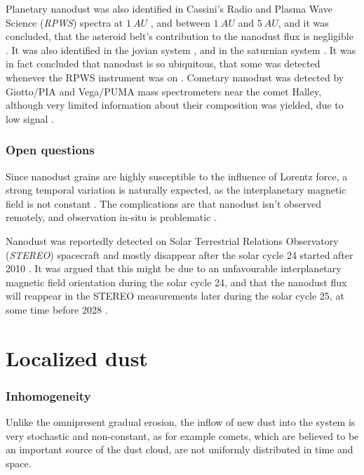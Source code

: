 Planetary nanodust was also identified in Cassini's Radio and Plasma Wave Science (\textit{RPWS}) spectra 
at $\SI{1}{AU}$ \citep{schippers2014nanodust}, and  between $\SI{1}{AU}$ and $\SI{5}{AU}$, and it was concluded, that the asteroid belt's contribution to the nanodust flux is negligible \citep{schippers2015nanodust}. It was also identified in the jovian system \citep{meyer2009detecting}, and in the saturnian system \citep{kempf2005high}. It was in fact concluded that nanodust is so ubiquitous, that some was detected whenever the RPWS instrument was on \citep{schippers2015nanodust}. Cometary nanodust was detected by Giotto/PIA and Vega/PUMA mass spectrometers near the comet Halley, although very limited information about their composition was yielded, due to low signal \cite{utterback1990attogram}.

\subsubsection{Open questions}

Since nanodust grains are highly susceptible to the influence of Lorentz force, a strong temporal variation is naturally expected, as the interplanetary magnetic field is not constant \citep{poppe2020effects}. The complications are that nanodust isn't observed remotely, and observation in-situ is problematic \citep{pantellini2012nano,kellogg2016dust,kellogg2017note}. 

Nanodust was reportedly detected on Solar Terrestrial Relations Observatory (\textit{STEREO}) spacecraft \citep{meyer2009dust} and mostly disappear after the solar cycle 24 started after 2010 \citep{zaslavsky2012interplanetary}. It was argued that this might be due to an unfavourable interplanetary magnetic field orientation during the solar cycle 24, and that the nanodust flux will reappear in the STEREO measurements later during the solar cycle 25, at some time before 2028 \citep{poppe2022effects}.

\section{Localized dust}

\subsubsection{Inhomogeneity}

Unlike the omnipresent gradual erosion, the inflow of new dust into the system is very stochastic and non-constant, as for example comets, which are believed to be an important source of the dust cloud, are not uniformly distributed in time and space.


